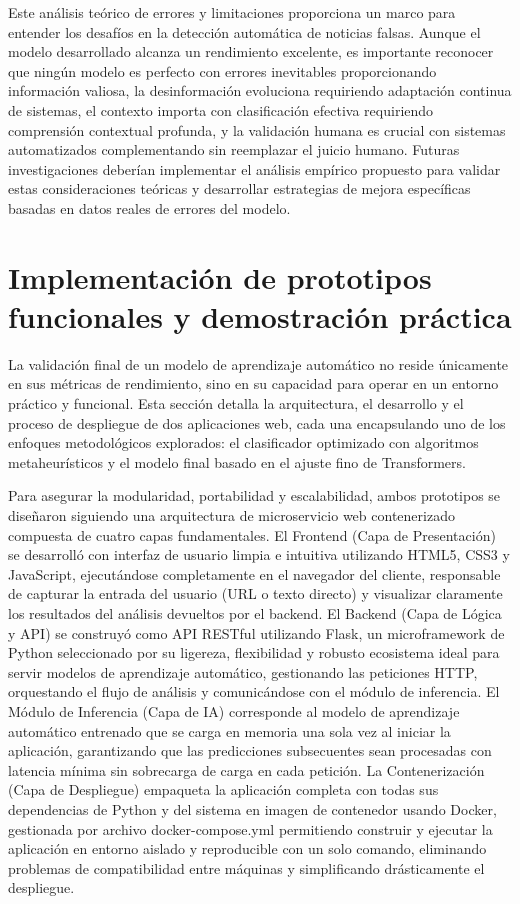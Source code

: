 Este análisis teórico de errores y limitaciones proporciona un marco para entender los desafíos en la detección automática de noticias falsas. Aunque el modelo desarrollado alcanza un rendimiento excelente, es importante reconocer que ningún modelo es perfecto con errores inevitables proporcionando información valiosa, la desinformación evoluciona requiriendo adaptación continua de sistemas, el contexto importa con clasificación efectiva requiriendo comprensión contextual profunda, y la validación humana es crucial con sistemas automatizados complementando sin reemplazar el juicio humano. Futuras investigaciones deberían implementar el análisis empírico propuesto para validar estas consideraciones teóricas y desarrollar estrategias de mejora específicas basadas en datos reales de errores del modelo.

\section{Implementación de prototipos funcionales y demostración práctica}
\label{sec:implementacion_prototipos}

La validación final de un modelo de aprendizaje automático no reside únicamente en sus métricas de rendimiento, sino en su capacidad para operar en un entorno práctico y funcional. Esta sección detalla la arquitectura, el desarrollo y el proceso de despliegue de dos aplicaciones web, cada una encapsulando uno de los enfoques metodológicos explorados: el clasificador optimizado con algoritmos metaheurísticos y el modelo final basado en el ajuste fino de Transformers.

Para asegurar la modularidad, portabilidad y escalabilidad, ambos prototipos se diseñaron siguiendo una arquitectura de microservicio web contenerizado compuesta de cuatro capas fundamentales. El Frontend (Capa de Presentación) se desarrolló con interfaz de usuario limpia e intuitiva utilizando HTML5, CSS3 y JavaScript, ejecutándose completamente en el navegador del cliente, responsable de capturar la entrada del usuario (URL o texto directo) y visualizar claramente los resultados del análisis devueltos por el backend. El Backend (Capa de Lógica y API) se construyó como API RESTful utilizando Flask, un microframework de Python seleccionado por su ligereza, flexibilidad y robusto ecosistema ideal para servir modelos de aprendizaje automático, gestionando las peticiones HTTP, orquestando el flujo de análisis y comunicándose con el módulo de inferencia. El Módulo de Inferencia (Capa de IA) corresponde al modelo de aprendizaje automático entrenado que se carga en memoria una sola vez al iniciar la aplicación, garantizando que las predicciones subsecuentes sean procesadas con latencia mínima sin sobrecarga de carga en cada petición. La Contenerización (Capa de Despliegue) empaqueta la aplicación completa con todas sus dependencias de Python y del sistema en imagen de contenedor usando Docker, gestionada por archivo docker-compose.yml permitiendo construir y ejecutar la aplicación en entorno aislado y reproducible con un solo comando, eliminando problemas de compatibilidad entre máquinas y simplificando drásticamente el despliegue.

